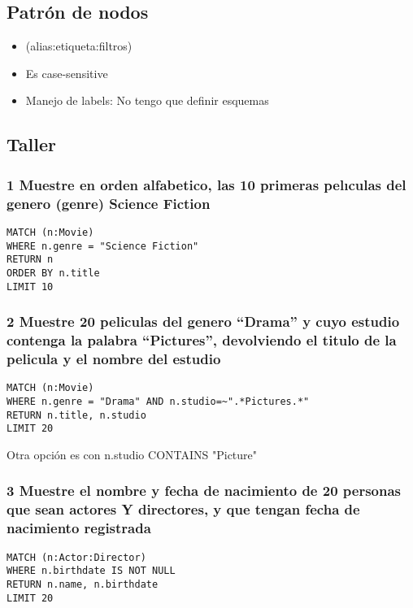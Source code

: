 \subsection*{Patrón de nodos}
\begin{itemize}
\item (alias:etiqueta:{filtros})
\item Es case-sensitive
\item Manejo de labels: No tengo que definir esquemas
\end{itemize}


\subsection*{Taller}
\subsubsection*{1 Muestre en orden alfabetico, las 10 primeras pelıculas del genero (genre) Science Fiction}
 
\begin{verbatim}
MATCH (n:Movie)
WHERE n.genre = "Science Fiction"
RETURN n
ORDER BY n.title
LIMIT 10
\end{verbatim}

\subsubsection*{2 Muestre 20 peliculas del genero “Drama” y cuyo estudio contenga la palabra “Pictures”, devolviendo el titulo de la pelicula y el nombre del estudio}

\begin{verbatim}
MATCH (n:Movie)
WHERE n.genre = "Drama" AND n.studio=~".*Pictures.*"
RETURN n.title, n.studio
LIMIT 20
\end{verbatim}

Otra opción es con n.studio CONTAINS "Picture"

\subsubsection*{3 Muestre el nombre y fecha de nacimiento de 20 personas que sean actores Y directores, y que tengan fecha de nacimiento registrada}

\begin{verbatim}
MATCH (n:Actor:Director)
WHERE n.birthdate IS NOT NULL
RETURN n.name, n.birthdate
LIMIT 20
\end{verbatim}

